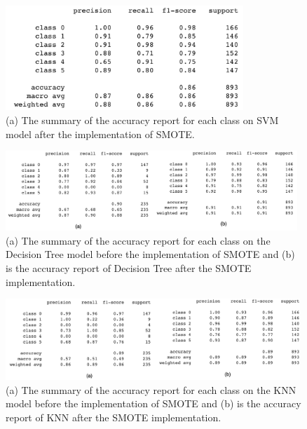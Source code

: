 \documentclass{article}
\begin{document}
\begin{figure}[h]\label{smote-svm}
\centering
\includegraphics[width=0.8\textwidth]{sv_a.png}
\caption{(a) The summary of the accuracy report for each class on SVM model after the implementation of SMOTE.}\label{fig1}
\end{figure}




\begin{figure}[h]
\centering
\includegraphics[width=0.98\textwidth]{ddtree.png}
\caption{(a) The summary of the accuracy report for each class on the Decision Tree model before the implementation of SMOTE and (b) is the accuracy report of Decision Tree after the SMOTE implementation.}\label{decis_reppo}
\end{figure}



\begin{figure}[h]
\centering
\includegraphics[width=0.99\textwidth]{knn_finalll.png}
\caption{(a) The summary of the accuracy report for each class on the KNN model before the implementation of SMOTE and (b) is the accuracy report of KNN after the SMOTE implementation.}\label{knn_reppo}
\end{figure}
\end{document}
